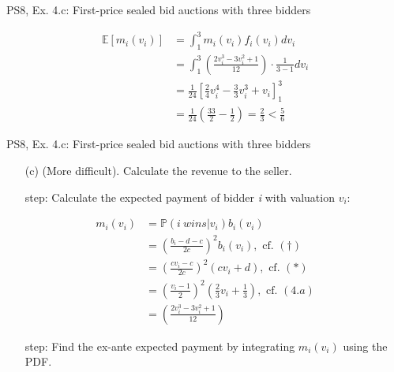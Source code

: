 \begin{frame}{PS8, Ex. 4.c: First-price sealed bid auctions with three bidders}
\begin{multicols}{2}
      \vspace{-12pt}
      \begin{align*}
        \mathbb{E}[m_i(v_i)]&=\textstyle\int_1^3m_i(v_i)f_i(v_i)dv_i\\
                            &=\textstyle\int_1^3\left(\frac{2v_i^3-3v_i^2+1}{12}\right)\cdot\frac{1}{3-1}dv_i\\
                            &=\frac{1}{24}\left[\frac{2}{4}v_i^4-\frac{3}{3}v_i^3+v_i\right]_1^3\\
                            &=\frac{1}{24}\left(\frac{33}{2}-\frac{1}{2}\right)=\frac{2}{3}<\frac{5}{6}
      \end{align*}
      \vfill\null
    \end{multicols}
    \vfill\null
\end{frame}
\begin{frame}{PS8, Ex. 4.c: First-price sealed bid auctions with three bidders}
    \begin{itemize}
      \item[(c)] (More difficult). Calculate the revenue to the seller.
    \end{itemize}
    \vspace{-8pt}
    \begin{multicols}{2}
      \begin{itemize}
        \item[\nth{1} step:] Calculate the expected payment of bidder \textit{i} with valuation $v_i$:
      \end{itemize}
      \vspace{-10pt}
      \begin{align*}
        m_i(v_i)&=\mathbb{P}(i\ wins|v_i)b_i(v_i)\\
                &=\left(\frac{b_i-d-c}{2c}\right)^2b_i(v_i),\text{ cf. }(\dagger)\\
                &=\left(\frac{cv_i-c}{2c}\right)^2(cv_i+d),\text{ cf. }(*)\\
                &=\left(\frac{v_i-1}{2}\right)^2\left(\frac{2}{3}v_i+\frac{1}{3}\right),\text{ cf. }(4.a)\\
                &=\left(\frac{2v_i^3-3v_i^2+1}{12}\right)
      \end{align*}
      \vspace{-10pt}
      \begin{itemize}
        \item[\nth{2} step:] Find the ex-ante expected payment by integrating $m_i(v_i)$ using the PDF.
      \end{itemize}

\end{multicols}
\end{frame}
